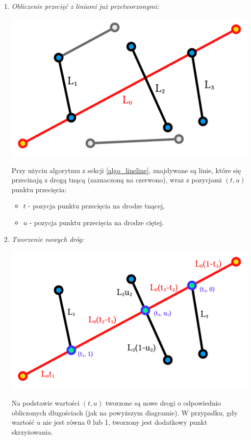 \documentclass{article}
\begin{document}
\begin{enumerate}
    \item \emph{Obliczenie przecięć z liniami już przetworzonymi:} \\
          \centerline{\includegraphics[scale=0.3]{images/line1.png}}
          
          Przy użyciu algorytmu z sekcji \ref{algo_lineline}, znajdywane są linie, które się przecinają z drogą tnącą (zaznaczoną na czerwono), wraz z pozycjami \((t, u)\) punktu przecięcia:
          \begin{itemize}
              \item \(t\) - pozycja punktu przecięcia na drodze tnącej,
              \item \(u\) - pozycja punktu przecięcia na drodze ciętej.
          \end{itemize}
          
\pagebreak
    \item \emph{Tworzenie nowych dróg:} \\
          \centerline{\includegraphics[scale=0.3]{images/line2.png}}
          
          Na podstawie wartości \((t, u)\) tworzone są nowe drogi o odpowiednio obliczonych długościach (jak na powyższym diagramie). W przypadku, gdy wartość \(u\) nie jest równa 0 lub 1, tworzony jest dodatkowy punkt skrzyżowania.
\end{enumerate}
\end{document}
